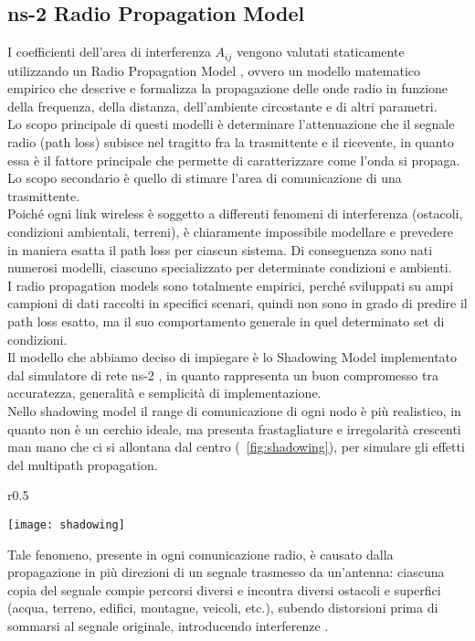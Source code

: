 \subsection{ns-2 Radio Propagation Model}
I coefficienti dell'area di interferenza $A_{ij}$ vengono valutati staticamente utilizzando un Radio Propagation Model \cite{seybold2005introduction}, ovvero un modello matematico empirico che descrive e formalizza la propagazione delle onde radio in funzione della frequenza, della distanza, dell'ambiente circostante e di altri parametri. \\
Lo scopo principale di questi modelli è determinare l'attenuazione che il segnale radio (path loss) subisce nel tragitto fra la trasmittente e il ricevente, in quanto essa è il fattore principale che permette di caratterizzare come l'onda si propaga. Lo scopo secondario è quello di stimare l'area di comunicazione di una trasmittente.\\
Poiché ogni link wireless è soggetto a differenti fenomeni di interferenza (ostacoli, condizioni ambientali, terreni), è chiaramente impossibile modellare e prevedere in maniera esatta il path loss per ciascun sistema. Di conseguenza sono nati numerosi modelli, ciascuno specializzato per determinate condizioni e ambienti. \\
I radio propagation models sono totalmente empirici, perché sviluppati su ampi campioni di dati raccolti in specifici scenari, quindi non sono in grado di predire il path loss esatto, ma il suo comportamento generale in quel determinato set di condizioni.  \\
Il modello che abbiamo deciso di impiegare è lo Shadowing Model implementato dal simulatore di rete ns-2 \cite{nsMan}, in quanto rappresenta un buon compromesso tra accuratezza, generalità e semplicità di implementazione. \\
Nello shadowing model il range di comunicazione di ogni nodo è più realistico, in quanto non è un cerchio ideale, ma presenta frastagliature e irregolarità crescenti man mano che ci si allontana dal centro (\figurename\ \ref{fig:shadowing}), per simulare gli effetti del multipath propagation. \\
\begin{wrapfigure}{r}{0.5\textwidth}
	\begin{center}
		\texttt{[image: shadowing]}
	\end{center}
	\caption{Range di comunicazione nello Shadowing Model\label{fig:shadowing}}
\end{wrapfigure}
Tale fenomeno, presente in ogni comunicazione radio, è causato dalla propagazione in più direzioni di un segnale trasmesso da un'antenna: ciascuna copia del segnale compie percorsi diversi e incontra diversi ostacoli e superfici (acqua, terreno, edifici, montagne, veicoli, etc.), subendo distorsioni prima di sommarsi al segnale originale, introducendo interferenze \cite{umar2004mobile}. \\
